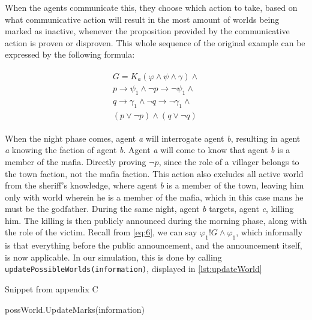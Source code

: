When the agents communicate this, they choose which action to take, based on
what communicative action will result in the most amount of worlds being marked
as inactive, whenever the proposition provided by the communicative action is 
proven or disproven. 
This whole sequence of the original example can be expressed by the following 
formula:

\begin{align}
	\begin{split}
		G = K_a(\varphi \land \psi \land\gamma)\land \\ 
		p \rightarrow \psi_1 \land \neg p \rightarrow \neg \psi_1 \land \\
		q \rightarrow \gamma_1 \land \neg q \rightarrow \neg \gamma_1 \land \\
		(p \lor \neg p) \land (q \lor \neg q)
		\label{eq:7}
	\end{split}
\end{align}

When the night phase comes, agent \textit{a} will interrogate agent \textit{b},
resulting in agent \textit{a} knowing the faction of agent \textit{b}. Agent 
\textit{a} will come to know that agent \textit{b} is a member of the mafia. 
Directly proving $\neg p$, since the role of a villager belongs to the town 
faction, not the mafia faction. This action also excludes all active world from 
the sheriff's knowledge, where agent \textit{b} is a member of the town, 
leaving him only with world wherein he is a member of the mafia, which in this 
case mans he must be the godfather. During the same night, agent \textit{b} 
targets, agent \textit{c}, killing him. The killing is then publicly announced 
during the morning phase, along with the role of the victim. Recall from 
\cref{eq:6}, we can say $\varphi_1!G\land\varphi_1$, which informally is that 
everything before the public announcement, and the announcement itself, is now 
applicable. In our simulation, this is done by calling 
\lstinline[]{updatePossibleWorlds(information)}, displayed in
\ref{lst:updateWorld}

\begin{algorithm}[h]
	\caption{Snippet from appendix C}
	\begin{algorithmic}[1]
		\State possWorld.UpdateMarks(information)
		\EndFor
		\EndFor
		\EndFunction
	\end{algorithmic}
\end{algorithm}\label{lst:updateWorld}

